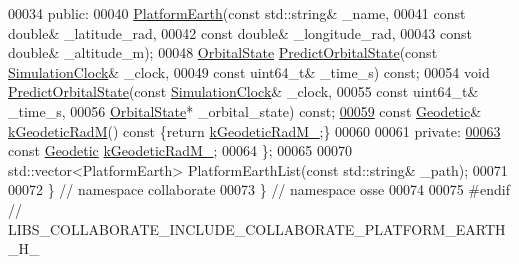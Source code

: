 \begin{DoxyCode}
00034  \textcolor{keyword}{public}:
00040   \hyperlink{classosse_1_1collaborate_1_1_platform_earth_afc5a80925b8a51fbdb93e0cc8eea3607}{PlatformEarth}(\textcolor{keyword}{const} std::string& \_name,
00041                 \textcolor{keyword}{const} \textcolor{keywordtype}{double}& \_latitude\_rad,
00042                 \textcolor{keyword}{const} \textcolor{keywordtype}{double}& \_longitude\_rad,
00043                 \textcolor{keyword}{const} \textcolor{keywordtype}{double}& \_altitude\_m);
00048   \hyperlink{classosse_1_1collaborate_1_1_orbital_state}{OrbitalState} \hyperlink{classosse_1_1collaborate_1_1_platform_earth_aff04ed83ab0ae2f7b3bcb1019588efcd}{PredictOrbitalState}(\textcolor{keyword}{const} 
      \hyperlink{classosse_1_1collaborate_1_1_simulation_clock}{SimulationClock}& \_clock,
00049                                    \textcolor{keyword}{const} uint64\_t& \_time\_s) \textcolor{keyword}{const};
00054   \textcolor{keywordtype}{void} \hyperlink{classosse_1_1collaborate_1_1_platform_earth_aff04ed83ab0ae2f7b3bcb1019588efcd}{PredictOrbitalState}(\textcolor{keyword}{const} \hyperlink{classosse_1_1collaborate_1_1_simulation_clock}{SimulationClock}& \_clock,
00055                            \textcolor{keyword}{const} uint64\_t& \_time\_s,
00056                            \hyperlink{classosse_1_1collaborate_1_1_orbital_state}{OrbitalState}* \_orbital\_state) \textcolor{keyword}{const};
\hyperlink{classosse_1_1collaborate_1_1_platform_earth_ac422459d6fb6cf713b52730f7e51f5b0}{00059}   \textcolor{keyword}{const} \hyperlink{classosse_1_1collaborate_1_1_geodetic}{Geodetic}& \hyperlink{classosse_1_1collaborate_1_1_platform_earth_ac422459d6fb6cf713b52730f7e51f5b0}{kGeodeticRadM}()\textcolor{keyword}{ const }\{\textcolor{keywordflow}{return} 
      \hyperlink{classosse_1_1collaborate_1_1_platform_earth_ab79ec0de68f62f6355614bc3963cf44f}{kGeodeticRadM\_};\}
00060 
00061  \textcolor{keyword}{private}:
\hyperlink{classosse_1_1collaborate_1_1_platform_earth_ab79ec0de68f62f6355614bc3963cf44f}{00063}   \textcolor{keyword}{const} \hyperlink{classosse_1_1collaborate_1_1_geodetic}{Geodetic} \hyperlink{classosse_1_1collaborate_1_1_platform_earth_ab79ec0de68f62f6355614bc3963cf44f}{kGeodeticRadM\_};
00064 \};
00065 
00070 std::vector<PlatformEarth> PlatformEarthList(\textcolor{keyword}{const} std::string& \_path);
00071 
00072 \}  \textcolor{comment}{// namespace collaborate}
00073 \}  \textcolor{comment}{// namespace osse}
00074 
00075 \textcolor{preprocessor}{#endif  // LIBS\_COLLABORATE\_INCLUDE\_COLLABORATE\_PLATFORM\_EARTH\_H\_}
\end{DoxyCode}
